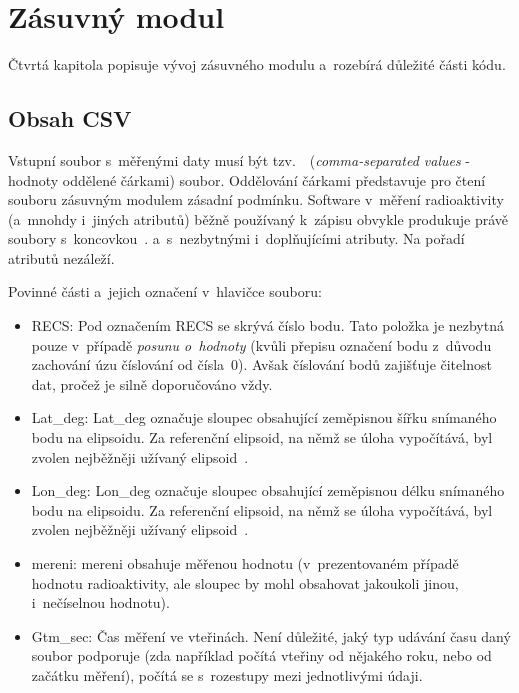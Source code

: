 \chapter{Zásuvný modul}
\label{4-plugin}

Čtvrtá kapitola popisuje vývoj zásuvného modulu a~rozebírá důležité části kódu. 

\section{Obsah CSV}
\label{obsah}

Vstupní soubor s~měřenými daty musí být tzv.~~(\textit{comma-separated values} - hodnoty oddělené
čárkami) soubor. Oddělování čárkami představuje pro čtení souboru zásuvným modulem zásadní podmínku.
Software v~měření radioaktivity (a~mnohdy i~jiných atributů) běžně používaný k~zápisu obvykle
produkuje právě soubory s~koncovkou~. a~s~nezbytnými i~doplňujícími atributy. Na pořadí
atributů nezáleží. 

Povinné části a~jejich označení v~hlavičce souboru: 
\begin{itemize}

	\item RECS: Pod označením RECS se skrývá číslo bodu. Tato položka je nezbytná pouze
	v~případě \textit{posunu o~hodnoty} (kvůli přepisu označení bodu z~důvodu zachování úzu číslování
	od čísla~0). Avšak číslování bodů zajišťuje čitelnost dat, pročež je silně doporučováno vždy. 
	
	\item Lat\_deg: Lat\_deg označuje sloupec obsahující zeměpisnou šířku snímaného bodu na elipsoidu.
	Za referenční elipsoid, na němž se úloha vypočítává, byl zvolen nejběžněji užívaný
	elipsoid~. 
	
	\item Lon\_deg: Lon\_deg označuje sloupec obsahující zeměpisnou délku snímaného bodu na elipsoidu.
	Za referenční elipsoid, na němž se úloha vypočítává, byl zvolen nejběžněji užívaný
	elipsoid~. 
	
	\item mereni: mereni obsahuje měřenou hodnotu (v~prezentovaném případě hodnotu radioaktivity, ale
	sloupec by mohl obsahovat jakoukoli jinou, i~nečíselnou hodnotu). 
	
	\item Gtm\_sec: Čas měření ve vteřinách. Není důležité, jaký typ udávání času daný soubor
	podporuje (zda například počítá vteřiny od nějakého roku, nebo od začátku měření), počítá
	se s~rozestupy mezi jednotlivými údaji. 

\end{itemize}

